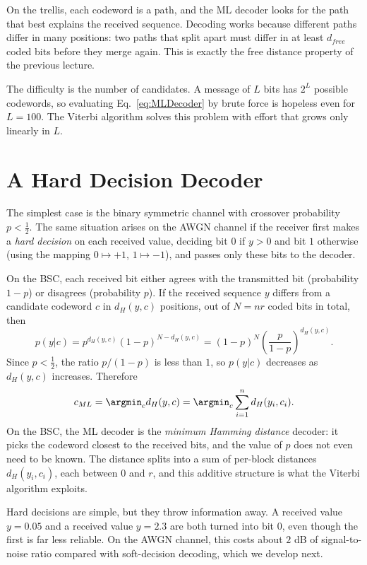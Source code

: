 On the trellis, each codeword is a path, and the ML decoder looks for the path that best explains the received sequence. Decoding works because different paths differ in many positions: two paths that split apart must differ in at least \(d_{free}\) coded bits before they merge again. This is exactly the free distance property of the previous lecture.

The difficulty is the number of candidates. A message of \(L\) bits has \(2^L\) possible codewords, so evaluating Eq.~\ref{eq:MLDecoder} by brute force is hopeless even for \(L = 100\). The Viterbi algorithm solves this problem with effort that grows only linearly in \(L\).

\section{A Hard Decision Decoder}\label{sec:hard}
The simplest case is the binary symmetric channel with crossover probability \(p < \frac{1}{2}\). The same situation arises on the AWGN channel if the receiver first makes a \emph{hard decision} on each received value, deciding bit \(0\) if \(y > 0\) and bit \(1\) otherwise (using the mapping \(0 \mapsto +1\), \(1 \mapsto -1\)), and passes only these bits to the decoder.

On the BSC, each received bit either agrees with the transmitted bit (probability \(1-p\)) or disagrees (probability \(p\)). If the received sequence \(y\) differs from a candidate codeword \(c\) in \(d_H(y,c)\) positions, out of \(N = nr\) coded bits in total, then
\[p(y|c) = p^{d_H(y,c)} (1-p)^{N - d_H(y,c)} = (1-p)^N \left(\frac{p}{1-p}\right)^{d_H(y,c)}.\]
Since \(p < \frac{1}{2}\), the ratio \(p/(1-p)\) is less than \(1\), so \(p(y|c)\) decreases as \(d_H(y,c)\) increases. Therefore
\begin{equation}
c_{ML} = \argmin_{c} d_H(y,c) = \argmin_{c} \sum_{i=1}^{n} d_H(y_i, c_i). \label{eq:HardML}
\end{equation}
On the BSC, the ML decoder is the \emph{minimum Hamming distance} decoder: it picks the codeword closest to the received bits, and the value of \(p\) does not even need to be known. The distance splits into a sum of per-block distances \(d_H(y_i, c_i)\), each between \(0\) and \(r\), and this additive structure is what the Viterbi algorithm exploits.

Hard decisions are simple, but they throw information away. A received value \(y = 0.05\) and a received value \(y = 2.3\) are both turned into bit \(0\), even though the first is far less reliable. On the AWGN channel, this costs about \(2\) dB of signal-to-noise ratio compared with soft-decision decoding, which we develop next.

